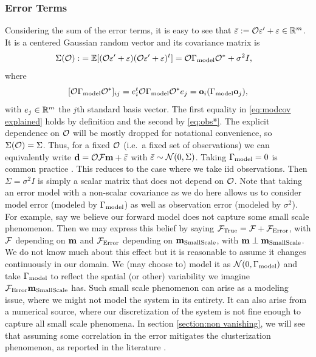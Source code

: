 \documentclass{amsart}
\numberwithin{equation}{section}
\begin{document}
\subsubsection{Error Terms}
Considering the sum of the error terms, it is easy to see that
$\bar{\varepsilon} := \mathcal{O} \varepsilon' + \varepsilon \in \mathbb{R}^m$. It is a centered Gaussian
random vector and its covariance matrix is
\begin{align}\label{eq:Sigma}
  \begin{split}
    \Sigma(\mathcal{O}) :&= \mathbb{E}[ (\mathcal{O} \varepsilon' + \varepsilon)  (\mathcal{O} \varepsilon' + \varepsilon)^t ] 
    = \mathcal{O} \Gamma_{\textup{model}} \mathcal{O}^* + \sigma^2I , 
  \end{split}
\end{align}
where
\begin{equation}\label{eq:modcov explained}
  [\mathcal{O} \Gamma_{\textup{model}} \mathcal{O}^*]_{ij} = e_i^t \mathcal{O} \Gamma_{\textup{model}} \mathcal{O}^* e_j = \mathbf{o}_i (\Gamma_{\textup{model}} \mathbf{o}_j),
\end{equation}
with $e_j \in \mathbb{R}^m$ the $j$th standard basis vector. The first
equality in \eqref{eq:modcov explained} holds by definition and the
second by \eqref{eq:obs*}. The explicit dependence on $\mathcal{O}$ will be
mostly dropped for notational convenience, so $\Sigma(\mathcal{O}) =
\Sigma$. Thus, for a fixed $\mathcal{O}$ (i.e.\ a fixed set of observations)
we can equivalently write $\mathbf{d} = \mathcal{O} \mathcal{F} \mathbf{m} + \bar{\varepsilon}$ with
$\bar{\varepsilon} \sim \mathcal{N}(0,\Sigma)$. Taking $\Gamma_{\textup{model}} = 0$ is common
practice \cite{Tarantola05,KaipioSomersalo05,Vogel02}. This reduces to
the case where we take iid observations. Then $\Sigma = \sigma^2I$ is
simply a scalar matrix that does not depend on $\mathcal{O}$. Note that
taking an error model with a non-scalar covariance as we do here
allows us to consider model error (modeled by $\Gamma_{\textup{model}}$) as well as
observation error (modeled by $\sigma^2$). For example, say we believe
our forward model does not capture some small scale phenomenon.  Then
we may express this belief by saying $\mathcal{F}_{\textup{True}} = \mathcal{F} + \mathcal{F}_{\textup{Error}}$, with $\mathcal{F}$
depending on $\mathbf{m}$ and $\mathcal{F}_{\textup{Error}}$ depending on $\mathbf{m}_{\textup{SmallScale}}$, with $\mathbf{m}
\perp \mathbf{m}_{\textup{SmallScale}}$. We do not know much about this effect but it is
reasonable to assume it changes continuously in our domain. We (may
choose to) model it as $\mathcal{N} (0, \Gamma_{\textup{model}})$ and take $\Gamma_{\textup{model}}$ to
reflect the spatial (or other) variability we imagine $\mathcal{F}_{\textup{Error}} \mathbf{m}_{\textup{SmallScale}}$
has. Such small scale phenomenon can arise as a modeling issue, where
we might not model the system in its entirety. It can also arise from
a numerical source, where our discretization of the system is not fine
enough to capture all small scale phenomena. In section
\ref{section:non vanishing}, we will see that assuming some
correlation in the error mitigates the clusterization phenomenon, as
reported in the literature \cite{Ucinski05}.
\end{document}
